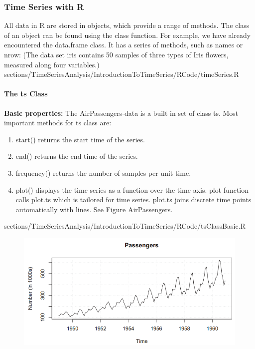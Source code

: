 \subsubsection{Time Series with \color{blue}R}
{
\RTheory
{	All data in {\color{blue}R} are stored in objects, which provide a range of methods. The class of an object can be found using the {\color{blue}class} function. For example, we have already encountered the {\color{blue}data.frame} class. It has a series of methods, such as {\color{blue}names} or {\color{blue}nrow}: \vfill
(The data set iris contains 50 samples of three types of Iris flowers, measured along four variables.)}
{sections/TimeSeriesAnalysis/IntroductionToTimeSeries/RCode/timeSeries.R}
\paragraph{The {\color{blue}ts} Class}
{\RTheory
{\textbf{Basic properties:}\vfill
	The AirPassengers-data is a built in set of class {\color{blue}ts}. Most important methods for {\color{blue}ts} class are:\vfill 
\begin{enumerate}
\item  {\color{blue}start()} returns the start time of the series.
\item  {\color{blue}end()} returns the end time of the series.
\item  {\color{blue}frequency()} returns the number of samples per unit time.
\item  {\color{blue}plot()} displays the time series as a function over the time axis. {\color{blue}plot} function calls {\color{blue}plot.ts} which is tailored for time series. {\color{blue}plot.ts} joins discrete time points automatically with lines.  See Figure AirPassengers. 
\end{enumerate}}
{sections/TimeSeriesAnalysis/IntroductionToTimeSeries/RCode/tsClassBasic.R}
\begin{figure}[H]\centering
	\begin{minipage}[c]{0.5\textwidth}
	\includegraphics[width=1\linewidth]{images/tsAirPassengers.png}

\end{minipage}
\end{figure}}}
